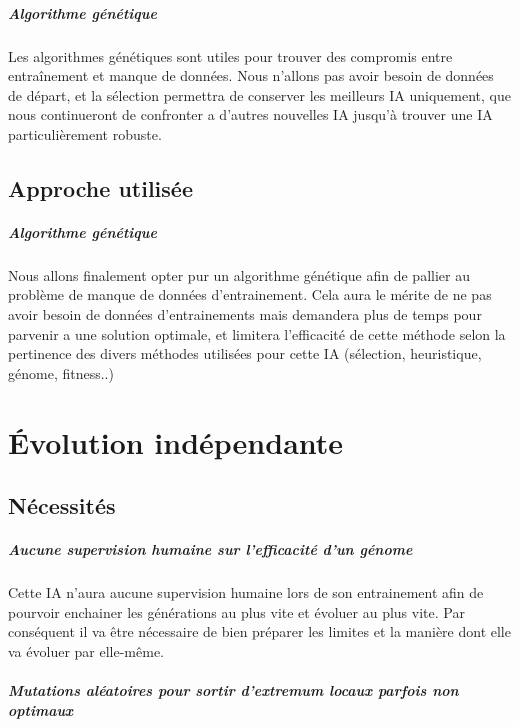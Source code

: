 \documentclass{scrreprt}
\begin{document}
			\paragraph{Algorithme génétique}
			
			Les algorithmes génétiques sont utiles pour trouver des compromis entre entraînement et manque de données. Nous n'allons pas avoir besoin de données de départ, et la sélection permettra de conserver les meilleurs IA uniquement, que nous continueront de confronter a d'autres nouvelles IA jusqu'à trouver une IA particulièrement robuste.
		
		\section{Approche utilisée}
			\paragraph{Algorithme génétique}
			
			Nous allons finalement opter pur un algorithme génétique afin de pallier au problème de manque de données d'entrainement. Cela aura le mérite de ne pas avoir besoin de données d'entrainements mais demandera plus de temps pour parvenir a une solution optimale, et limitera l'efficacité de cette méthode selon la pertinence des divers méthodes utilisées pour cette IA (sélection, heuristique, génome, fitness..)
			
			
									
	\chapter{Évolution indépendante}
		\section{Nécessités}
			\paragraph{Aucune supervision humaine sur l'efficacité d'un génome}
			
			Cette IA n'aura aucune supervision humaine lors de son entrainement afin de pourvoir enchainer les générations au plus vite et évoluer au plus vite. Par conséquent il va être nécessaire de bien préparer les limites et la manière dont elle va évoluer par elle-même.
			
			\paragraph{Mutations aléatoires pour sortir d'extremum locaux parfois non optimaux} 
			
\end{document}
